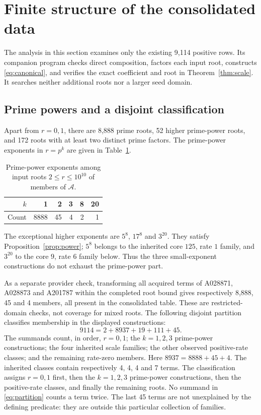 \documentclass[11pt]{article}
\theoremstyle{definition}
\theoremstyle{remark}
\begin{document}
\section{Finite structure of the consolidated data}\label{sec:finite}
The analysis in this section examines only the existing 9,114 positive
rows. Its companion program checks direct composition, factors each
input root, constructs \eqref{eq:canonical}, and verifies the exact
coefficient and root in Theorem~\ref{thm:scale}. It searches neither
additional roots nor a larger seed domain.

\subsection{Prime powers and a disjoint classification}
Apart from $r=0,1$, there are 8,888 prime roots, 52 higher prime-power
roots, and 172 roots with at least two distinct prime factors.
The prime-power exponents in $r=p^{k}$ are given in
Table~\ref{tab:exponents}.
\begin{table}[htbp]
\centering
\caption{Prime-power exponents among input roots $2\leq r\leq10^{10}$
of members of $\mathcal A$.}
\label{tab:exponents}
\begin{tabular}{rrrrrr}
\toprule
$k$&1&2&3&8&20\\
\midrule
Count&8888&45&4&2&1\\
\bottomrule
\end{tabular}
\end{table}
The exceptional higher exponents are $5^{8}$, $17^{8}$ and $3^{20}$.
They satisfy Proposition~\ref{prop:power}; $5^{8}$ belongs to the
inherited core $125$, rate $1$ family, and $3^{20}$ to the core $9$,
rate $6$ family below. Thus the three small-exponent constructions
do not exhaust the prime-power part.

As a separate provider check, transforming all acquired terms of
A028871, A028873 and A201787 within the completed root bound gives
respectively 8,888, 45 and 4 members, all present in the consolidated
table. These are restricted-domain checks, not coverage for mixed roots.
The following disjoint partition classifies membership in the
displayed constructions:
\begin{equation}\label{eq:partition}
 9114=2+8937+19+111+45.
\end{equation}
The summands count, in order, $r=0,1$; the $k=1,2,3$ prime-power
constructions; the four inherited scale families; the other observed
positive-rate classes; and the remaining rate-zero members. Here
$8937=8888+45+4$. The inherited classes contain respectively
4, 4, 4 and 7 terms. The classification assigns $r=0,1$ first, then the $k=1,2,3$
prime-power constructions, then the positive-rate classes, and finally
the remaining roots. No summand in \eqref{eq:partition} counts a
term twice. The last 45 terms are not unexplained by the defining
predicate: they are outside this particular collection of families.
\end{document}
